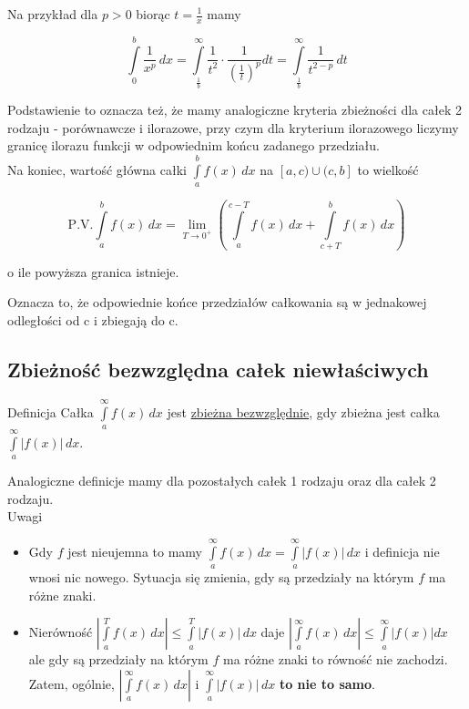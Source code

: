 Na przykład dla $ p > 0 $ biorąc $ t = \frac{1}{x} $ mamy 

$$ \int\limits_{0}^{b} \frac{1}{x^p} \,dx = \int\limits_{\frac{1}{b}}^{\infty} \frac{1}{t^2} \cdot \frac{1}{ \left( \frac{1}{t} \right)^p } dt
= \int\limits_{\frac{1}{b}}^{\infty} \frac{1}{t^{2 - p}} \,dt $$

Podstawienie to oznacza też, że mamy analogiczne kryteria zbieżności dla całek 2 rodzaju - porównawcze i ilorazowe, przy
czym dla kryterium ilorazowego liczymy granicę ilorazu funkcji w odpowiednim końcu zadanego przedziału. \\

Na koniec, wartość główna całki $ \int\limits_{a}^{b} f(x) \,dx $ na $[a,c)\cup(c,b]$ to wielkość

$$ \textrm{P.V.} \int\limits_{a}^{b} f(x) \,dx = \lim_{T \to 0^+} 
\left( \int\limits_{a}^{c - T} f(x) \,dx + \int\limits_{c + T}^{b} f(x) \,dx \right) $$

o ile powyższa granica istnieje.

Oznacza to, że odpowiednie końce przedziałów całkowania są w jednakowej odległości od c i zbiegają do c.

\subsection{Zbieżność bezwzględna całek niewłaściwych}

\begin{tw}{Definicja}
Całka $ \int\limits_{a}^{\infty} f(x) \,dx $ jest \underline{zbieżna bezwzględnie}, gdy zbieżna jest całka
$ \int\limits_{a}^{\infty} |f(x)| \,dx $.
\end{tw}

Analogiczne definicje mamy dla pozostałych całek 1 rodzaju oraz dla całek 2 rodzaju. \\

Uwagi

\begin{itemize}
    \item Gdy $f$ jest nieujemna to mamy $ \int\limits_{a}^{\infty} f(x) \,dx = \int\limits_{a}^{\infty} |f(x)| \,dx $
    i definicja nie wnosi nic nowego. Sytuacja się zmienia, gdy są przedziały na którym $f$ ma różne znaki.
    
    \item Nierówność $ \left| \int\limits_{a}^{T} f(x) \,dx \right| \leq \int\limits_{a}^{T} |f(x)| \,dx $ daje
    $ \left| \int\limits_{a}^{\infty} f(x) \,dx \right| \leq \int\limits_{a}^{\infty} |f(x)| dx $ ale gdy są przedziały
    na którym $f$ ma różne znaki to równość nie zachodzi.
    Zatem, ogólnie, $ \left| \int\limits_{a}^{\infty} f(x) \,dx \right| $ i $ \int\limits_{a}^{\infty} |f(x)| \,dx $
    \textbf{to nie to samo}. \\
\end{itemize}

